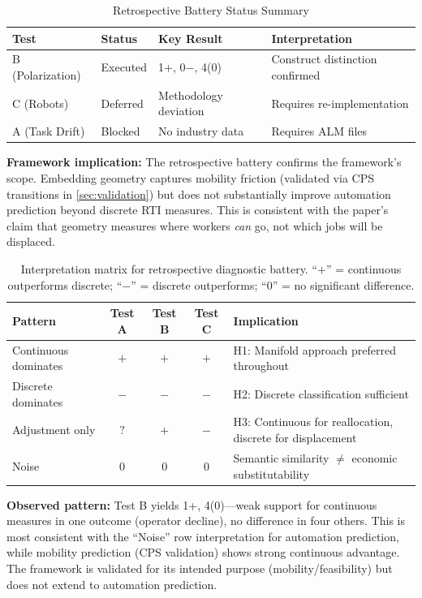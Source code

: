 \documentclass[12pt]{article}
\begin{document}
\begin{table}[h!]
\centering
\caption{Retrospective Battery Status Summary}
\label{tab:battery-summary}
\begin{tabular}{llll}
\toprule
\textbf{Test} & \textbf{Status} & \textbf{Key Result} & \textbf{Interpretation} \\
\midrule
B (Polarization) & Executed & 1+, 0$-$, 4(0) & Construct distinction confirmed \\
C (Robots) & Deferred & Methodology deviation & Requires re-implementation \\
A (Task Drift) & Blocked & No industry data & Requires ALM files \\
\bottomrule
\end{tabular}
\end{table}


\textbf{Framework implication:} The retrospective battery confirms the framework's scope. Embedding geometry captures mobility friction (validated via CPS transitions in \cref{sec:validation}) but does not substantially improve automation prediction beyond discrete RTI measures. This is consistent with the paper's claim that geometry measures where workers \emph{can} go, not which jobs will be displaced.


\begin{table}[h!]
\centering
\begin{tabular}{|l|c|c|c|l|}
\hline
\textbf{Pattern} & \textbf{Test A} & \textbf{Test B} & \textbf{Test C} & \textbf{Implication} \\
\hline
Continuous dominates & $+$ & $+$ & $+$ & H1: Manifold approach preferred throughout \\
\hline
Discrete dominates & $-$ & $-$ & $-$ & H2: Discrete classification sufficient \\
\hline
Adjustment only & $?$ & $+$ & $-$ & H3: Continuous for reallocation, discrete for displacement \\
\hline
Noise & $0$ & $0$ & $0$ & Semantic similarity $\neq$ economic substitutability \\
\hline
\end{tabular}
\caption{Interpretation matrix for retrospective diagnostic battery. ``$+$'' = continuous outperforms discrete; ``$-$'' = discrete outperforms; ``$0$'' = no significant difference.}
\label{tab:interpretation-matrix}
\end{table}

\textbf{Observed pattern:} Test B yields 1+, 4(0)---weak support for continuous measures in one outcome (operator decline), no difference in four others. This is most consistent with the ``Noise'' row interpretation for automation prediction, while mobility prediction (CPS validation) shows strong continuous advantage. The framework is validated for its intended purpose (mobility/feasibility) but does not extend to automation prediction.




\end{document}
